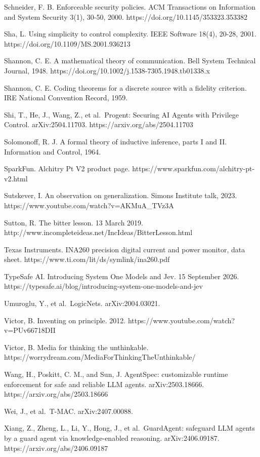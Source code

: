\documentclass[
  10pt,
]{article}
\begin{document}
Schneider, F. B. Enforceable security policies. ACM Transactions on
Information and System Security 3(1), 30-50, 2000.
https://doi.org/10.1145/353323.353382

Sha, L. Using simplicity to control complexity. IEEE Software 18(4),
20-28, 2001. https://doi.org/10.1109/MS.2001.936213

Shannon, C. E. A mathematical theory of communication. Bell System
Technical Journal, 1948.
https://doi.org/10.1002/j.1538-7305.1948.tb01338.x

Shannon, C. E. Coding theorems for a discrete source with a fidelity
criterion. IRE National Convention Record, 1959.

Shi, T., He, J., Wang, Z., et al.~Progent: Securing AI Agents with
Privilege Control. arXiv:2504.11703. https://arxiv.org/abs/2504.11703

Solomonoff, R. J. A formal theory of inductive inference, parts I and
II. Information and Control, 1964.

SparkFun. Alchitry Pt V2 product page.
https://www.sparkfun.com/alchitry-pt-v2.html

Sutskever, I. An observation on generalization. Simons Institute talk,
2023. https://www.youtube.com/watch?v=AKMuA\_TVz3A

Sutton, R. The bitter lesson. 13 March 2019.
http://www.incompleteideas.net/IncIdeas/BitterLesson.html

Texas Instruments. INA260 precision digital current and power monitor,
data sheet. https://www.ti.com/lit/ds/symlink/ina260.pdf

TypeSafe AI. Introducing System One Models and Jev. 15 September 2026.
https://typesafe.ai/blog/introducing-system-one-models-and-jev

Umuroglu, Y., et al.~LogicNets. arXiv:2004.03021.

Victor, B. Inventing on principle. 2012.
https://www.youtube.com/watch?v=PUv66718DII

Victor, B. Media for thinking the unthinkable.
https://worrydream.com/MediaForThinkingTheUnthinkable/

Wang, H., Poskitt, C. M., and Sun, J. AgentSpec: customizable runtime
enforcement for safe and reliable LLM agents. arXiv:2503.18666.
https://arxiv.org/abs/2503.18666

Wei, J., et al.~T-MAC. arXiv:2407.00088.

Xiang, Z., Zheng, L., Li, Y., Hong, J., et al.~GuardAgent: safeguard LLM
agents by a guard agent via knowledge-enabled reasoning.
arXiv:2406.09187. https://arxiv.org/abs/2406.09187
\end{document}
